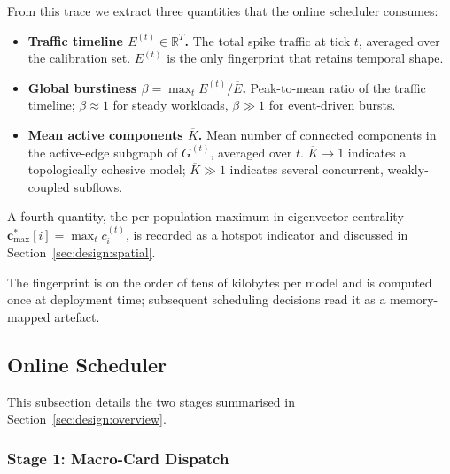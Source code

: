 \documentclass[letterpaper,twocolumn,10pt]{article}
\begin{document}
From this trace we extract three quantities that the online scheduler consumes:

\begin{itemize}
    \item \textbf{Traffic timeline $E^{(t)} \in \mathbb{R}^T$.} The total spike traffic at tick $t$, averaged over the calibration set. $E^{(t)}$ is the only fingerprint that retains temporal shape.
    \item \textbf{Global burstiness $\beta = \max_t E^{(t)} / \overline{E}$.} Peak-to-mean ratio of the traffic timeline; $\beta \approx 1$ for steady workloads, $\beta \gg 1$ for event-driven bursts.
    \item \textbf{Mean active components $\overline{K}$.} Mean number of connected components in the active-edge subgraph of $G^{(t)}$, averaged over $t$. $\overline{K}\!\to\!1$ indicates a topologically cohesive model; $\overline{K} \gg 1$ indicates several concurrent, weakly-coupled subflows.
\end{itemize}

A fourth quantity, the per-population maximum in-eigenvector centrality $\mathbf{c}^{*}_{\max}[i] = \max_t c^{(t)}_i$, is recorded as a hotspot indicator and discussed in Section~\ref{sec:design:spatial}.

The fingerprint is on the order of tens of kilobytes per model and is computed once at deployment time; subsequent scheduling decisions read it as a memory-mapped artefact.

\subsection{Online Scheduler}
\label{sec:design:online}

This subsection details the two stages summarised in Section~\ref{sec:design:overview}.

\subsubsection{Stage 1: Macro-Card Dispatch}
\label{sec:design:macro}
\end{document}
